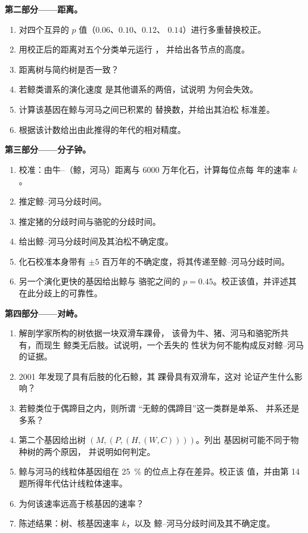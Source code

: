 \begin{problem}
\medskip
\noindent\textbf{第二部分——距离。}
\begin{enumerate}[resume]
  \item 对四个互异的 $p$ 值（$0.06$、$0.10$、$0.12$、
        $0.14$）进行多重替换校正。
  \item 用校正后的距离对五个分类单元运行 ，
        并给出各节点的高度。
  \item 距离树与简约树是否一致？
  \item 若鲸类谱系的演化速度
        是其他谱系的两倍，试说明  为何会失效。
  \item 计算该基因在鲸与河马之间已积累的
        替换数，并给出其泊松
        标准差。
  \item 根据该计数给出由此推得的年代的相对精度。
\end{enumerate}

\medskip
\noindent\textbf{第三部分——分子钟。}
\begin{enumerate}[resume]
  \item 校准：由牛--（鲸，河马）距离与
        6000 万年化石，计算每位点每
        年的速率 $k$。
  \item 推定鲸–河马分歧时间。
  \item 推定猪的分歧时间与骆驼的分歧时间。
  \item 给出鲸–河马分歧时间及其泊松不确定度。
  \item 化石校准本身带有 $\pm 5$
        百万年的不确定度，将其传递至鲸–河马分歧时间。
  \item 另一个演化更快的基因给出鲸与
        骆驼之间的 $p = 0.45$。校正该值，并评述其
        在此分歧上的可靠性。
\end{enumerate}

\medskip
\noindent\textbf{第四部分——对峙。}
\begin{enumerate}[resume]
  \item 解剖学家所构的树依据一块双滑车踝骨，
        该骨为牛、猪、河马和骆驼所共有，而现生
        鲸类无后肢。试说明，一个丢失的
        性状为何不能构成反对鲸–河马的证据。
  \item 2001 年发现了具有后肢的化石鲸，其
        踝骨具有双滑车，这对
        论证产生什么影响？
  \item 若鲸类位于偶蹄目之内，则所谓
        “无鲸的偶蹄目”这一类群是单系、
        并系还是多系？
  \item 第二个基因给出树 $(M,(P,(H,(W,C))))$。列出
        基因树可能不同于物种树的两个原因，
        并说明如何判定。
  \item 鲸与河马的线粒体基因组在
        \qty{25}{\%} 的位点上存在差异。校正该
        值，并由第 14 题所得年代估计线粒体速率。
  \item 为何该速率远高于核基因的速率？
  \item 陈述结果：树、核基因速率 $k$，以及
        鲸–河马分歧时间及其不确定度。
\end{enumerate}
\end{problem}
